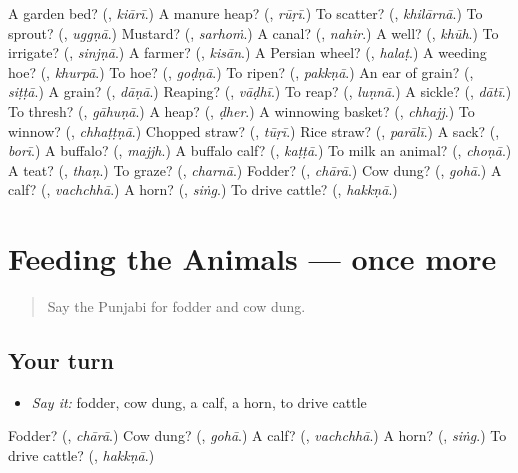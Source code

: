 \begin{tcolorbox}[breakable,colback=teal!4,colframe=teal!35!black,title={Before you move on}]
A garden bed? (\textbf{}, \emph{kiārī}.) A manure heap? (\textbf{}, \emph{rūṛī}.) To scatter? (\textbf{}, \emph{khilārnā}.) To sprout? (\textbf{}, \emph{uggṇā}.) Mustard? (\textbf{}, \emph{sarhoṁ}.) A canal? (\textbf{}, \emph{nahir}.) A well? (\textbf{}, \emph{khūh}.) To irrigate? (\textbf{}, \emph{sinjṇā}.) A farmer? (\textbf{}, \emph{kisān}.) A Persian wheel? (\textbf{}, \emph{halaṭ}.) A weeding hoe? (\textbf{}, \emph{khurpā}.) To hoe? (\textbf{}, \emph{goḍṇā}.) To ripen? (\textbf{}, \emph{pakkṇā}.) An ear of grain? (\textbf{}, \emph{siṭṭā}.) A grain? (\textbf{}, \emph{dāṇā}.) Reaping? (\textbf{}, \emph{vāḍhī}.) To reap? (\textbf{}, \emph{luṇnā}.) A sickle? (\textbf{}, \emph{dātī}.) To thresh? (\textbf{}, \emph{gāhuṇā}.) A heap? (\textbf{}, \emph{ḍher}.) A winnowing basket? (\textbf{}, \emph{chhajj}.) To winnow? (\textbf{}, \emph{chhaṭṭṇā}.) Chopped straw? (\textbf{}, \emph{tūṛī}.) Rice straw? (\textbf{}, \emph{parālī}.) A sack? (\textbf{}, \emph{borī}.) A buffalo? (\textbf{}, \emph{majjh}.) A buffalo calf? (\textbf{}, \emph{kaṭṭā}.) To milk an animal? (\textbf{}, \emph{choṇā}.) A teat? (\textbf{}, \emph{thaṇ}.) To graze? (\textbf{}, \emph{charnā}.) Fodder? (\textbf{}, \emph{chārā}.) Cow dung? (\textbf{}, \emph{gohā}.) A calf? (\textbf{}, \emph{vachchhā}.) A horn? (\textbf{}, \emph{siṅg}.) To drive cattle? (\textbf{}, \emph{hakkṇā}.)
\end{tcolorbox}
\section[(dialogue)]{Feeding the Animals — once more}

\label{lesson:PA-R308-review-final-308}



\begin{quote}
Say the Punjabi for fodder and cow dung.
\end{quote}

\subsection*{Your turn}
\begin{itemize}
\raggedright
  \item \emph{Say it:} fodder, cow dung, a calf, a horn, to drive cattle
\end{itemize}

\begin{tcolorbox}[breakable,colback=teal!4,colframe=teal!35!black,title={Before you move on}]
Fodder? (\textbf{}, \emph{chārā}.) Cow dung? (\textbf{}, \emph{gohā}.) A calf? (\textbf{}, \emph{vachchhā}.) A horn? (\textbf{}, \emph{siṅg}.) To drive cattle? (\textbf{}, \emph{hakkṇā}.)
\end{tcolorbox}
